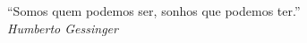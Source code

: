\begin{titlepage}
 \vspace*{5cm}
 \begin{flushright}
  ``Somos quem podemos ser, sonhos que podemos ter.''\\\textit{Humberto Gessinger}
  \vspace{1cm}
 \end{flushright}
\end{titlepage}

